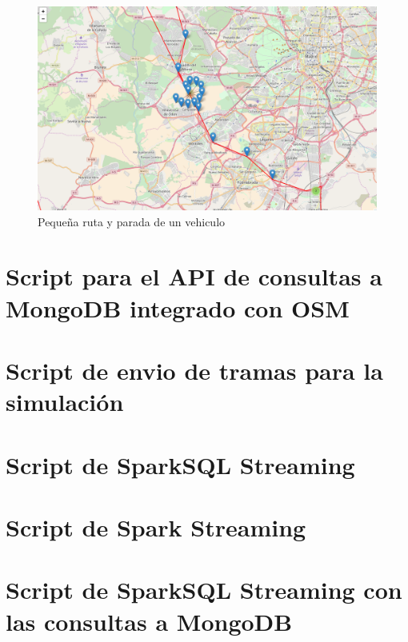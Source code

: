 \begin{figure}[htp]
\centering
\includegraphics[scale=.30]{Anexos/rutaConParada.png}
\caption{Pequeña ruta y parada de un vehiculo}
\label{littleRouteWithStop}
\end{figure}


\chapter{Script para el API de consultas a MongoDB integrado con OSM}\label{apend.B}


\newpage
\chapter{Script de envio de tramas para la simulación}\label{apend.C}


\newpage
\chapter{Script de SparkSQL Streaming}\label{apend.D}


\newpage
\chapter{Script de Spark Streaming}\label{apend.E}


\newpage
\chapter{Script de SparkSQL Streaming con las consultas a MongoDB}\label{apend.F}


